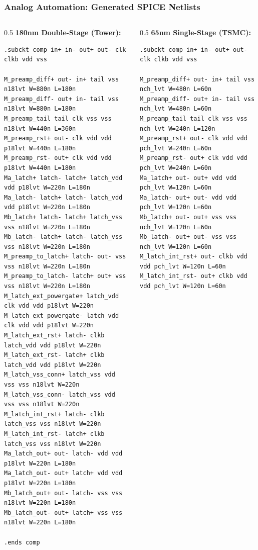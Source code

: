 \documentclass[aspectratio=169]{beamer}
\begin{document}
\begin{frame}[fragile]
  \frametitle{Analog Automation: Generated SPICE Netlists}
  \begin{columns}
    \begin{column}{0.5\textwidth}
      \scriptsize
      \textbf{180nm Double-Stage (Tower):}
      \begin{lstlisting}[basicstyle=\ttfamily\fontsize{3.5}{4.5}\selectfont]
.subckt comp in+ in- out+ out- clk clkb vdd vss

M_preamp_diff+ out- in+ tail vss n18lvt W=880n L=180n
M_preamp_diff- out+ in- tail vss n18lvt W=880n L=180n
M_preamp_tail tail clk vss vss n18lvt W=440n L=360n
M_preamp_rst+ out- clk vdd vdd p18lvt W=440n L=180n
M_preamp_rst- out+ clk vdd vdd p18lvt W=440n L=180n
Ma_latch+ latch- latch+ latch_vdd vdd p18lvt W=220n L=180n
Ma_latch- latch+ latch- latch_vdd vdd p18lvt W=220n L=180n
Mb_latch+ latch- latch+ latch_vss vss n18lvt W=220n L=180n
Mb_latch- latch+ latch- latch_vss vss n18lvt W=220n L=180n
M_preamp_to_latch+ latch- out- vss vss n18lvt W=220n L=180n
M_preamp_to_latch- latch+ out+ vss vss n18lvt W=220n L=180n
M_latch_ext_powergate+ latch_vdd clk vdd vdd p18lvt W=220n
M_latch_ext_powergate- latch_vdd clk vdd vdd p18lvt W=220n
M_latch_ext_rst+ latch- clkb latch_vdd vdd p18lvt W=220n
M_latch_ext_rst- latch+ clkb latch_vdd vdd p18lvt W=220n
M_latch_vss_conn+ latch_vss vdd vss vss n18lvt W=220n
M_latch_vss_conn- latch_vss vdd vss vss n18lvt W=220n
M_latch_int_rst+ latch- clkb latch_vss vss n18lvt W=220n
M_latch_int_rst- latch+ clkb latch_vss vss n18lvt W=220n
Ma_latch_out+ out- latch- vdd vdd p18lvt W=220n L=180n
Ma_latch_out- out+ latch+ vdd vdd p18lvt W=220n L=180n
Mb_latch_out+ out- latch- vss vss n18lvt W=220n L=180n
Mb_latch_out- out+ latch+ vss vss n18lvt W=220n L=180n

.ends comp
      \end{lstlisting}
    \end{column}
    \begin{column}{0.5\textwidth}
      \scriptsize
      \textbf{65nm Single-Stage (TSMC):}
      \begin{lstlisting}[basicstyle=\ttfamily\fontsize{3.5}{4.5}\selectfont]
.subckt comp in+ in- out+ out- clk clkb vdd vss

M_preamp_diff+ out- in+ tail vss nch_lvt W=480n L=60n
M_preamp_diff- out+ in- tail vss nch_lvt W=480n L=60n
M_preamp_tail tail clk vss vss nch_lvt W=240n L=120n
M_preamp_rst+ out- clk vdd vdd pch_lvt W=240n L=60n
M_preamp_rst- out+ clk vdd vdd pch_lvt W=240n L=60n
Ma_latch+ out- out+ vdd vdd pch_lvt W=120n L=60n
Ma_latch- out+ out- vdd vdd pch_lvt W=120n L=60n
Mb_latch+ out- out+ vss vss nch_lvt W=120n L=60n
Mb_latch- out+ out- vss vss nch_lvt W=120n L=60n
M_latch_int_rst+ out- clkb vdd vdd pch_lvt W=120n L=60n
M_latch_int_rst- out+ clkb vdd vdd pch_lvt W=120n L=60n


\end{lstlisting}
\end{column}
\end{columns}
\end{frame}
\end{document}

